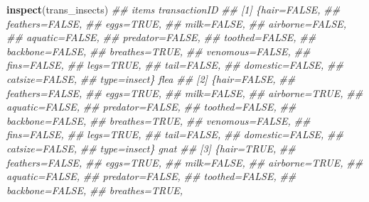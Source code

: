 \documentclass[
  notitlepage]{book}
\newenvironment{Shaded}{\begin{snugshade}}{\end{snugshade}}
\newcommand{\CommentTok}[1]{\textcolor[rgb]{0.56,0.35,0.01}{\textit{#1}}}
\newcommand{\KeywordTok}[1]{\textcolor[rgb]{0.13,0.29,0.53}{\textbf{#1}}}
\newcommand{\NormalTok}[1]{#1}
\begin{document}
\begin{Shaded}
\begin{Highlighting}[]
\KeywordTok{inspect}\NormalTok{(trans\_insects)}
\CommentTok{\#\#     items             transactionID}
\CommentTok{\#\# [1] \{hair=FALSE,                   }
\CommentTok{\#\#      feathers=FALSE,               }
\CommentTok{\#\#      eggs=TRUE,                    }
\CommentTok{\#\#      milk=FALSE,                   }
\CommentTok{\#\#      airborne=FALSE,               }
\CommentTok{\#\#      aquatic=FALSE,                }
\CommentTok{\#\#      predator=FALSE,               }
\CommentTok{\#\#      toothed=FALSE,                }
\CommentTok{\#\#      backbone=FALSE,               }
\CommentTok{\#\#      breathes=TRUE,                }
\CommentTok{\#\#      venomous=FALSE,               }
\CommentTok{\#\#      fins=FALSE,                   }
\CommentTok{\#\#      legs=TRUE,                    }
\CommentTok{\#\#      tail=FALSE,                   }
\CommentTok{\#\#      domestic=FALSE,               }
\CommentTok{\#\#      catsize=FALSE,                }
\CommentTok{\#\#      type=insect\}          flea    }
\CommentTok{\#\# [2] \{hair=FALSE,                   }
\CommentTok{\#\#      feathers=FALSE,               }
\CommentTok{\#\#      eggs=TRUE,                    }
\CommentTok{\#\#      milk=FALSE,                   }
\CommentTok{\#\#      airborne=TRUE,                }
\CommentTok{\#\#      aquatic=FALSE,                }
\CommentTok{\#\#      predator=FALSE,               }
\CommentTok{\#\#      toothed=FALSE,                }
\CommentTok{\#\#      backbone=FALSE,               }
\CommentTok{\#\#      breathes=TRUE,                }
\CommentTok{\#\#      venomous=FALSE,               }
\CommentTok{\#\#      fins=FALSE,                   }
\CommentTok{\#\#      legs=TRUE,                    }
\CommentTok{\#\#      tail=FALSE,                   }
\CommentTok{\#\#      domestic=FALSE,               }
\CommentTok{\#\#      catsize=FALSE,                }
\CommentTok{\#\#      type=insect\}          gnat    }
\CommentTok{\#\# [3] \{hair=TRUE,                    }
\CommentTok{\#\#      feathers=FALSE,               }
\CommentTok{\#\#      eggs=TRUE,                    }
\CommentTok{\#\#      milk=FALSE,                   }
\CommentTok{\#\#      airborne=TRUE,                }
\CommentTok{\#\#      aquatic=FALSE,                }
\CommentTok{\#\#      predator=FALSE,               }
\CommentTok{\#\#      toothed=FALSE,                }
\CommentTok{\#\#      backbone=FALSE,               }
\CommentTok{\#\#      breathes=TRUE,                }

\end{Highlighting}
\end{Shaded}
\end{document}
